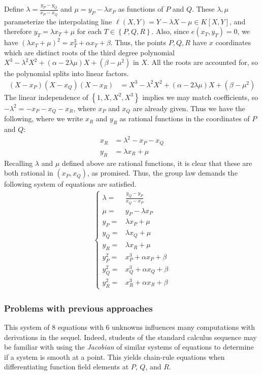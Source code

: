\documentclass[11pt,letterpaper]{article}
\theoremstyle{definition}
\newcommand{\6}{\mathbf}
\newcommand{\7}{\mathcal}
\begin{document}
Define $\lambda = \frac{y_P - y_Q}{x_P - x_Q}$ and $\mu = y_P - \lambda x_P$ as functions of $P$ and $Q$.
These $\lambda, \mu$ parameterize the interpolating line $\ell(X,Y) = Y - \lambda X - \mu \in K[X,Y]$, and therefore $y_T = \lambda x_T + \mu$ for each $T \in \left\{P, Q, R\right\}$.  Also, since $e(x_T, y_T) = 0$, we have $(\lambda x_T + \mu)^2 = x_T^3 + \alpha x_T + \beta$. Thus, the points $P, Q, R$ have $x$ coordinates which are distinct roots of the third degree polynomial $X^3 - \lambda^2 X^2 + (\alpha - 2\lambda \mu)X + (\beta - \mu^2)$ in $X$.
All the roots are accounted for, so the polynomial splits into linear factors. 
\begin{align}
(X-x_P)(X-x_Q)(X-x_R) &= X^3 - \lambda^2 X^2 + (\alpha - 2\lambda \mu)X + (\beta - \mu^2) 
\end{align}
The linear independence of $\left\{1,X,X^2,X^3\right\}$ implies we may match coefficients, so $-\lambda^2 = -x_P - x_Q - x_R$, where $x_P$ and $x_Q$ are already given. Thus we have the following, where we write $x_R$ and $y_R$ as rational functions in the coordinates of $P$ and $Q$:
\begin{align}
x_R &= \lambda^2 - x_P - x_Q \\ 
y_R &= \lambda x_R + \mu
\end{align}
Recalling $\lambda$ and $\mu$ defined above are rational functions, it is clear that these are both rational in $(x_P, x_Q)$, as promised. Thus, the group law demands the following system of equations are satisfied.
\begin{align}
\begin{cases} 
\lambda =& \frac{y_Q-y_P}{x_Q-x_P} \\
\mu =& y_P - \lambda x_P \\
y_P =& \lambda x_P + \mu\\
y_Q =& \lambda x_Q + \mu\\
y_R =& \lambda x_R + \mu\\
y_P^2 =& x_P^3 + \alpha x_P + \beta \\
y_Q^2 =& x_Q^3 + \alpha x_Q + \beta \\
y_R^2 =& x_R^3 + \alpha x_R + \beta 
\end{cases}
\end{align}

\subsubsection{Problems with previous approaches}
This system of $8$ equations with $6$ unknowns influences many computations with derivations in the sequel. Indeed, students of the standard calculus sequence may be familiar with using the \textit{Jacobian} of similar systems of equations to determine if a system is smooth at a point. This yields chain-rule equations when differentiating function field elements at $P$, $Q$, and $R$. 
\end{document}
